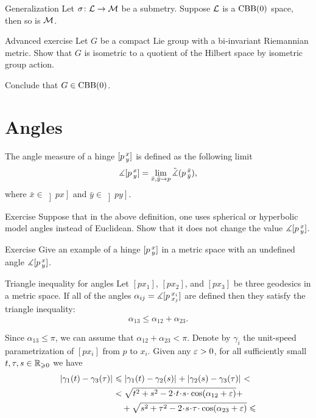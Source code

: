 \begin{thm}{Generalization}\label{thm:submetry-CBB}
Let $\sigma\colon\mathcal{L}\to\mathcal{M}$ be a submetry.
Suppose $\mathcal{L}$ is a $\mathrm{CBB}(0)$ space, then so is $\mathcal{M}$.
\end{thm}

\begin{thm}{Advanced exercise}
Let $G$ be a compact Lie group with a bi-invariant Riemannian metric.
Show that $G$ is isometric to a quotient of the Hilbert space by isometric group action.

Conclude that $G\in\mathrm{CBB}(0)$.
\end{thm}



\section{Angles}\label{sec:angles}


The angle measure of a hinge $[p\,{}^{x}_{y}]$ is defined as the following limit
\[\measuredangle[p\,{}^{x}_{y}]=\lim_{\bar x,\bar y\to p} \tilde\measuredangle(p\,{}^{\bar x}_{\bar y}),\]
where $\bar x\in\left]p x\right]$ and $\bar y\in\left]p y\right]$.

\begin{thm}{Exercise}
Suppose that in the above definition, one uses spherical or hyperbolic model angles instead of Euclidean.
Show that it does not change the value $\measuredangle[p\,{}^{x}_{y}]$.
\end{thm}


\begin{thm}{Exercise}\label{ex:undefined-angle}
Give an example of a hinge $[p\,{}^{x}_{y}]$ in a metric space with an undefined angle $\measuredangle[p\,{}^{x}_{y}]$.
\end{thm}

\begin{thm}{Triangle inequality for angles}
\label{claim:angle-3angle-inq}
Let  $[px_1]$, $[px_2]$, and $[px_3]$ be three geodesics in a metric space.
If all of the angles $\alpha_{i j}=\measuredangle[p\,{}^{x_i}_{x_j}]$ are defined then they satisfy the triangle inequality:
\[\alpha_{13}\le \alpha_{12}+\alpha_{23}.\]

\end{thm}


Since $\alpha_{13}\le\pi$, we can assume that $\alpha_{12}+\alpha_{23}< \pi$.
Denote by $\gamma_i$ the unit-speed parametrization of $[px_i]$ from $p$ to $x_i$.
Given any $\varepsilon>0$, for all sufficiently small $t,\tau,s\in\mathbb{R}_{\geqslant0}$ we have
\begin{align*}
\dist{\gamma_1(t)}{\gamma_3(\tau)}{}
&\le 
\dist{\gamma_1(t)}{\gamma_2(s)}{}+\dist{\gamma_2(s)}{\gamma_3(\tau)}{}<\\
&<
\sqrt{t^2+s^2-2\cdot t\cdot  s\cdot \cos(\alpha_{12}+\eps)} +
\\
&\quad+\sqrt{s^2+\tau^2-2\cdot s\cdot \tau\cdot \cos(\alpha_{23}+\eps)}\le
\end{align*}

